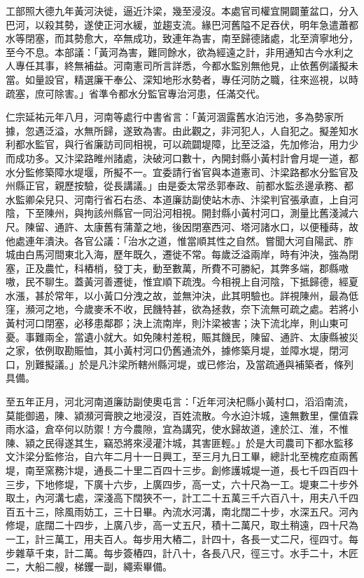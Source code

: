 \begin{pinyinscope}
 工部照大德九年黃河決徙，逼近汴梁，幾至浸沒。本處官司權宜開闢董盆口，分入巴河，以殺其勢，遂使正河水緩，並趨支流。緣巴河舊隘不足吞伏，明年急遣蕭都水等閉塞，而其勢愈大，卒無成功，致連年為害，南至歸德諸處，北至濟寧地分，至今不息。本部議：「黃河為害，難同餘水，欲為經遠之計，非用通知古今水利之人專任其事，終無補益。河南憲司所言詳悉，今都水監別無他見，止依舊例議擬未當。如量設官，精選廉干奉公、深知地形水勢者，專任河防之職，往來巡視，以時疏塞，庶可除害。」省準令都水分監官專治河患，任滿交代。



 仁宗延祐元年八月，河南等處行中書省言：「黃河涸露舊水泊污池，多為勢家所據，忽遇泛溢，水無所歸，遂致為害。由此觀之，非河犯人，人自犯之。擬差知水利都水監官，與行省廉訪司同相視，可以疏闢堤障，比至泛溢，先加修治，用力少而成功多。又汴梁路睢州諸處，決破河口數十，內開封縣小黃村計會月堤一道，都水分監修築障水堤堰，所擬不一。宜委請行省官與本道憲司、汴梁路都水分監官及州縣正官，親歷按驗，從長講議。」由是委太常丞郭奉政、前都水監丞邊承務、都水監卿朵兒只、河南行省石右丞、本道廉訪副使站木赤、汴梁判官張承直，上自河陰，下至陳州，與拘該州縣官一同沿河相視。開封縣小黃村河口，測量比舊淺減六尺。陳留、通許、太康舊有蒲葦之地，後因閉塞西河、塔河諸水口，以便種蒔，故他處連年潰決。各官公議：「治水之道，惟當順其性之自然。嘗聞大河自陽武、胙城由白馬河間東北入海，歷年既久，遷徙不常。每歲泛溢兩岸，時有沖決，強為閉塞，正及農忙，科樁梢，發丁夫，動至數萬，所費不可勝紀，其弊多端，郡縣嗷嗷，民不聊生。蓋黃河善遷徙，惟宜順下疏洩。今相視上自河陰，下抵歸德，經夏水漲，甚於常年，以小黃口分洩之故，並無沖決，此其明驗也。詳視陳州，最為低窪，瀕河之地，今歲麥禾不收，民饑特甚，欲為拯救，奈下流無可疏之處。若將小黃村河口閉塞，必移患鄰郡；決上流南岸，則汴梁被害；決下流北岸，則山東可憂。事難兩全，當遺小就大。如免陳村差稅，賑其饑民，陳留、通許、太康縣被災之家，依例取勘賑恤，其小黃村河口仍舊通流外，據修築月堤，並障水堤，閉河口，別難擬議。」於是凡汴梁所轄州縣河堤，或已修治，及當疏通與補築者，條列具備。



 至五年正月，河北河南道廉訪副使奧屯言：「近年河決杞縣小黃村口，滔滔南流，莫能御遏，陳、潁瀕河膏腴之地浸沒，百姓流散。今水迫汴城，遠無數里，儻值霖雨水溢，倉卒何以防禦！方今農隙，宜為講究，使水歸故道，達於江、淮，不惟陳、潁之民得遂其生，竊恐將來浸灌汴城，其害匪輕。」於是大司農司下都水監移文汴梁分監修治，自六年二月十一日興工，至三月九日工畢，總計北至槐疙疸兩舊堤，南至窯務汴堤，通長二十里二百四十三步。創修護城堤一道，長七千四百四十三步，下地修堤，下廣十六步，上廣四步，高一丈，六十尺為一工。堤東二十步外取土，內河溝七處，深淺高下闊狹不一，計工二十五萬三千六百八十，用夫八千四百五十三，除風雨妨工，三十日畢。內流水河溝，南北闊二十步，水深五尺。河內修堤，底闊二十四步，上廣八步，高一丈五尺，積十二萬尺，取土稍遠，四十尺為一工，計三萬工，用夫百人。每步用大樁二，計四十，各長一丈二尺，徑四寸。每步雜草千束，計二萬。每步簽樁四，計八十，各長八尺，徑三寸。水手二十，木匠二，大船二艘，梯钁一副，繩索畢備。




\end{pinyinscope}
